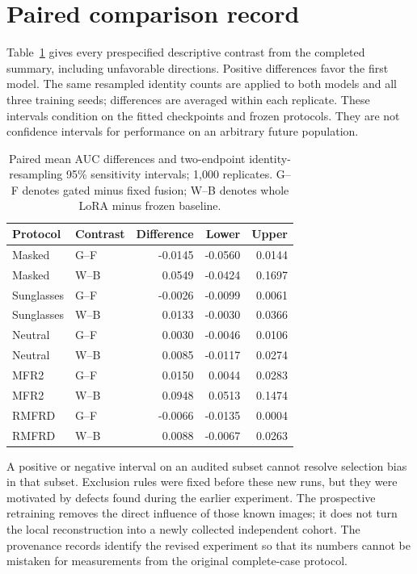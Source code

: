 \documentclass[12pt,a4paper,oneside]{report}
\begin{document}
\section{Paired comparison record}
Table~\ref{tab:paired} gives every prespecified descriptive contrast from the completed summary, including unfavorable directions. Positive differences favor the first model. The same resampled identity counts are applied to both models and all three training seeds; differences are averaged within each replicate. These intervals condition on the fitted checkpoints and frozen protocols. They are not confidence intervals for performance on an arbitrary future population.
\begin{table}[t]
\centering
\caption{Paired mean AUC differences and two-endpoint identity-resampling 95\% sensitivity intervals; 1,000 replicates. G--F denotes gated minus fixed fusion; W--B denotes whole LoRA minus frozen baseline.}
\label{tab:paired}
\begin{tabular}{llrrr}
\toprule
Protocol & Contrast & Difference & Lower & Upper\\
\midrule
Masked & G--F & -0.0145 & -0.0560 & 0.0144\\
Masked & W--B & 0.0549 & -0.0424 & 0.1697\\
Sunglasses & G--F & -0.0026 & -0.0099 & 0.0061\\
Sunglasses & W--B & 0.0133 & -0.0030 & 0.0366\\
Neutral & G--F & 0.0030 & -0.0046 & 0.0106\\
Neutral & W--B & 0.0085 & -0.0117 & 0.0274\\
MFR2 & G--F & 0.0150 & 0.0044 & 0.0283\\
MFR2 & W--B & 0.0948 & 0.0513 & 0.1474\\
RMFRD & G--F & -0.0066 & -0.0135 & 0.0004\\
RMFRD & W--B & 0.0088 & -0.0067 & 0.0263\\
\bottomrule
\end{tabular}
\end{table}
A positive or negative interval on an audited subset cannot resolve selection bias in that subset. Exclusion rules were fixed before these new runs, but they were motivated by defects found during the earlier experiment. The prospective retraining removes the direct influence of those known images; it does not turn the local reconstruction into a newly collected independent cohort. The provenance records identify the revised experiment so that its numbers cannot be mistaken for measurements from the original complete-case protocol.
\end{document}
